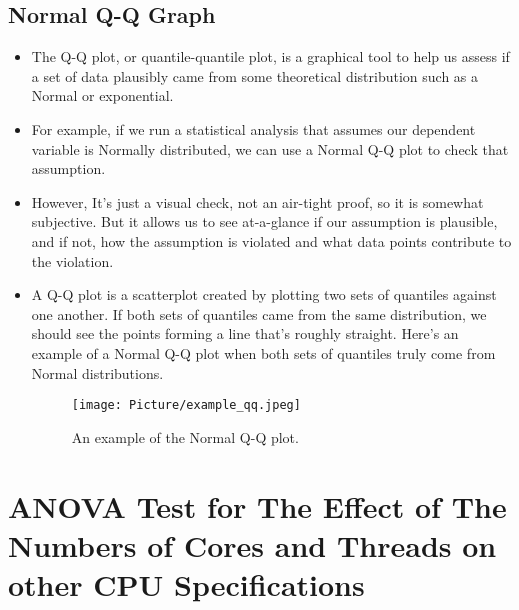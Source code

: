 \documentclass[a4paper]{article}
\begin{document}
\subsection{Normal Q-Q Graph}
\begin{itemize}
    \item[] The Q-Q plot, or quantile-quantile plot, is a graphical tool to help us assess if a set of data plausibly came from some theoretical distribution such as a Normal or exponential.
    
    \item[] For example, if we run a statistical analysis that assumes our dependent variable is Normally distributed, we can use a Normal Q-Q plot to check that assumption.
    
    \item[] However, It’s just a visual check, not an air-tight proof, so it is somewhat subjective. But it allows us to see at-a-glance if our assumption is plausible, and if not, how the assumption is violated and what data points contribute to the violation.
    
    \item[] A Q-Q plot is a scatterplot created by plotting two sets of quantiles against one another. If both sets of quantiles came from the same distribution, we should see the points forming a line that’s roughly straight. Here’s an example of a Normal Q-Q plot when both sets of quantiles truly come from Normal distributions.
    
    \begin{figure}[H]
        \centering
        \texttt{[image: Picture/example\_qq.jpeg]}
        \caption{An example of the Normal Q-Q plot.}
        \label{6.8.1}
    \end{figure}
\end{itemize}


\section{ANOVA Test for The Effect of The Numbers of Cores and Threads on other CPU Specifications}
\end{document}
